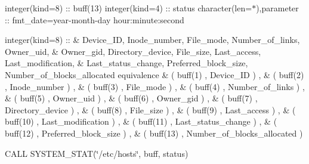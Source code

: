 integer(kind=8) \+:\+: buff(13) integer(kind=4) \+:\+: status character(len=$\ast$),parameter \+:\+: fmt\+\_\+date=\textquotesingle{}year-\/month-\/day hour\+:minute\+:second\textquotesingle{}

integer(kind=8) \+:\+: \& Device\+\_\+\+ID, Inode\+\_\+number, File\+\_\+mode, Number\+\_\+of\+\_\+links, Owner\+\_\+uid, \& Owner\+\_\+gid, Directory\+\_\+device, File\+\_\+size, Last\+\_\+access, Last\+\_\+modification, \& Last\+\_\+status\+\_\+change, Preferred\+\_\+block\+\_\+size, Number\+\_\+of\+\_\+blocks\+\_\+allocated equivalence \& ( buff(1) , Device\+\_\+\+ID ) , \& ( buff(2) , Inode\+\_\+number ) , \& ( buff(3) , File\+\_\+mode ) , \& ( buff(4) , Number\+\_\+of\+\_\+links ) , \& ( buff(5) , Owner\+\_\+uid ) , \& ( buff(6) , Owner\+\_\+gid ) , \& ( buff(7) , Directory\+\_\+device ) , \& ( buff(8) , File\+\_\+size ) , \& ( buff(9) , Last\+\_\+access ) , \& ( buff(10) , Last\+\_\+modification ) , \& ( buff(11) , Last\+\_\+status\+\_\+change ) , \& ( buff(12) , Preferred\+\_\+block\+\_\+size ) , \& ( buff(13) , Number\+\_\+of\+\_\+blocks\+\_\+allocated )

C\+A\+LL S\+Y\+S\+T\+E\+M\+\_\+\+S\+T\+AT(\char`\"{}/etc/hosts\char`\"{}, buff, status)

